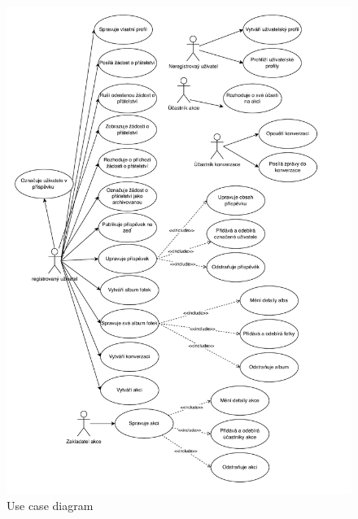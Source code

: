 \documentclass{article}
\begin{document}
\begin{figure}[p]
    \centering
    \includegraphics[scale=0.9]{fig/use-case.drawio.pdf}
    \caption{Use case diagram}
\end{figure}
\end{document}
